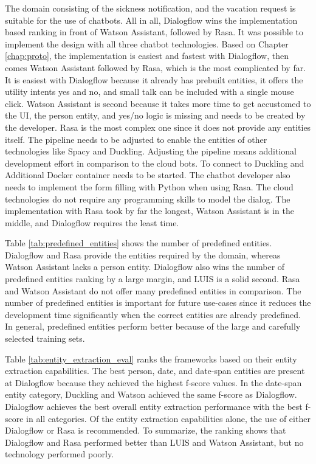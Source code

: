 The domain consisting of the sickness notification, and the vacation request is suitable for the use of chatbots.
All in all, Dialogflow wins the implementation based ranking in front of Watson Assistant, followed by Rasa.
It was possible to implement the design with all three chatbot technologies.
Based on Chapter \ref{chap:proto}, the implementation is easiest and fastest with Dialogflow, then comes Watson Assistant followed by Rasa, which is the most complicated by far.
It is easiest with Dialogflow because it already has prebuilt entities, it offers the utility intents yes and no, and small talk can be included with a single mouse click.
Watson Assistant is second because it takes more time to get accustomed to the UI, the person entity, and yes/no logic is missing and needs to be created by the developer.
Rasa is the most complex one since it does not provide any entities itself.
The pipeline needs to be adjusted to enable the entities of other technologies like Spacy and Duckling.
Adjusting the pipeline means additional development effort in comparison to the cloud bots.
To connect to Duckling and Additional Docker container needs to be started.
The chatbot developer also needs to implement the form filling with Python when using Rasa. 
The cloud technologies do not require any programming skills to model the dialog.
The implementation with Rasa took by far the longest, Watson Assistant is in the middle, and Dialogflow requires the least time.

Table \ref{tab:predefined_entities} shows the number of predefined entities.
Dialogflow and Rasa provide the entities required by the domain, whereas Watson Assistant lacks a person entity.
Dialogflow also wins the number of predefined entities ranking by a large margin, and LUIS is a solid second.
Rasa and Watson Assistant do not offer many predefined entities in comparison.
The number of predefined entities is important for future use-cases since it reduces the development time significantly when the correct entities are already predefined. 
In general, predefined entities perform better because of the large and carefully selected training sets.

Table \ref{tab:entity_extraction_eval} ranks the frameworks based on their 
entity extraction capabilities.
The best person, date, and date-span entities are present at Dialogflow because they achieved the highest f-score values.
In the date-span entity category, Duckling and Watson achieved the same f-score as Dialogflow.
Dialogflow achieves the best overall entity extraction performance with the best f-score in all categories. 
Of the entity extraction capabilities alone, the use of either Dialogflow or Rasa is recommended.
To summarize, the ranking shows that Dialogflow and Rasa performed better than LUIS and Watson Assistant, but no technology performed poorly.

